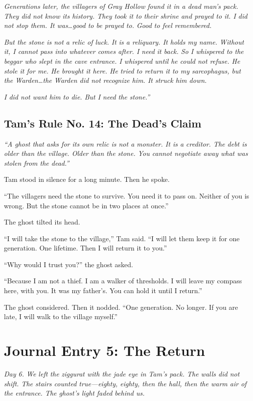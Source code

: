 \documentclass[11pt]{article}
\begin{document}
\textit{Generations later, the villagers of Gray Hollow found it in a dead man's pack. They did not know its history. They took it to their shrine and prayed to it. I did not stop them. It was\dots good to be prayed to. Good to feel remembered.}

\textit{But the stone is not a relic of luck. It is a reliquary. It holds my name. Without it, I cannot pass into whatever comes after. I need it back. So I whispered to the beggar who slept in the cave entrance. I whispered until he could not refuse. He stole it for me. He brought it here. He tried to return it to my sarcophagus, but the Warden\dots the Warden did not recognize him. It struck him down.}

\textit{I did not want him to die. But I need the stone.''}

\subsection*{Tam's Rule No. 14: The Dead's Claim}
\textit{``A ghost that asks for its own relic is not a monster. It is a creditor. The debt is older than the village. Older than the stone. You cannot negotiate away what was stolen from the dead.''}

Tam stood in silence for a long minute. Then he spoke.

``The villagers need the stone to survive. You need it to pass on. Neither of you is wrong. But the stone cannot be in two places at once.''

The ghost tilted its head.

``I will take the stone to the village,'' Tam said. ``I will let them keep it for one generation. One lifetime. Then I will return it to you.''

``Why would I trust you?'' the ghost asked.

``Because I am not a thief. I am a walker of thresholds. I will leave my compass here, with you. It was my father's. You can hold it until I return.''

The ghost considered. Then it nodded. ``One generation. No longer. If you are late, I will walk to the village myself.''

\section*{Journal Entry 5: The Return}
\textit{Day 6. We left the ziggurat with the jade eye in Tam's pack. The walls did not shift. The stairs counted true---eighty, eighty, then the hall, then the warm air of the entrance. The ghost's light faded behind us.}
\end{document}
